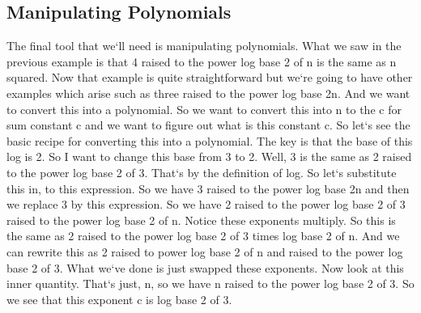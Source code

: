 \subsection{Manipulating Polynomials}
The final tool that we`ll need is manipulating polynomials.
What we saw in the previous example is that 4 raised to the power log base 2 of n is the same as n squared.
Now that example is quite straightforward but we`re going to have other examples which arise such as three raised to the power log base 2n.
And we want to convert this into a polynomial.
So we want to convert this into n to the c for sum constant c and we want to figure out what is this constant c.
So let`s see the basic recipe for converting this into a polynomial.
The key is that the base of this log is 2.
So I want to change this base from 3 to 2.
Well, 3 is the same as 2 raised to the power log base 2 of 3.
That`s by the definition of log.
So let`s substitute this in, to this expression.
So we have 3 raised to the power log base 2n and then we replace 3 by this expression.
So we have 2 raised to the power log base 2 of 3 raised to the power log base 2 of n.
Notice these exponents multiply.
So this is the same as 2 raised to the power log base 2 of 3 times log base 2 of n.
And we can rewrite this as 2 raised to power log base 2 of n and raised to the power log base 2 of 3.
What we`ve done is just swapped these exponents.
Now look at this inner quantity.
That`s just, n, so we have n raised to the power log base 2 of 3.
So we see that this exponent c is log base 2 of 3.

